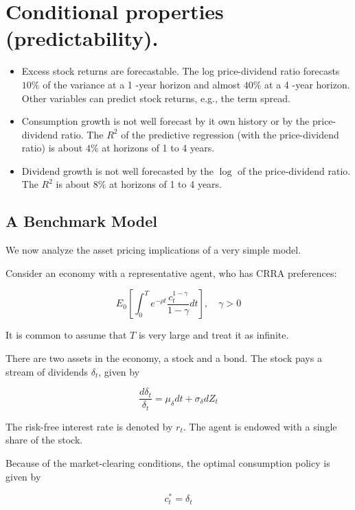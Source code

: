 \documentclass[\topdir/lecture\_notes.tex]{subfiles}
\begin{document}
\section{Conditional properties (predictability).}
\begin{itemize}
  \item Excess stock returns are forecastable. The log price-dividend ratio forecasts $10 \%$ of the variance at a 1 -year horizon and almost $40 \%$ at a 4 -year horizon. Other variables can predict stock returns, e.g., the term spread.
  \item Consumption growth is not well forecast by it own history or by the price-dividend ratio. The $R^{2}$ of the predictive regression (with the price-dividend ratio) is about $4 \%$ at horizons of 1 to 4 years.
  \item Dividend growth is not well forecasted by the $\log$ of the price-dividend ratio. The $R^{2}$ is about $8 \%$ at horizons of 1 to 4 years.
\end{itemize}

\subsection{A Benchmark Model}
We now analyze the asset pricing implications of a very simple model.

Consider an economy with a representative agent, who has CRRA preferences:

\begin{equation}
E_{0}\left[\int_{0}^{T} e^{-\rho t} \frac{c_{t}^{1-\gamma}}{1-\gamma} d t\right], \quad \gamma>0
\end{equation}

It is common to assume that $T$ is very large and treat it as infinite.

There are two assets in the economy, a stock and a bond. The stock pays a stream of dividends $\delta_{t}$, given by

\begin{equation}
\frac{d \delta_{t}}{\delta_{t}}=\mu_{\delta} d t+\sigma_{\delta} d Z_{t}
\end{equation}

The risk-free interest rate is denoted by $r_{t}$. The agent is endowed with a single share of the stock.

Because of the market-clearing conditions, the optimal consumption policy is given by

\begin{equation}
c_{t}^{*}=\delta_{t}
\end{equation}
\end{document}
